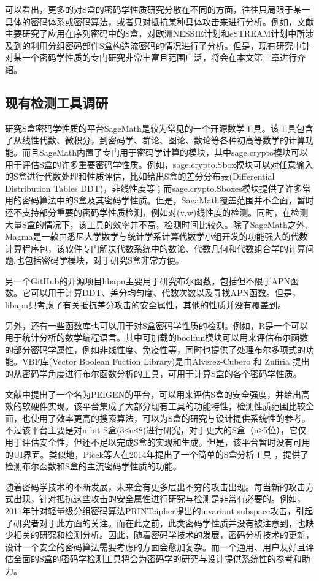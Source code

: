 \documentclass{xduugthesis}
\begin{document}
可以看出，更多的对S盒的密码学性质研究分散在不同的方面，往往只局限于某一具体的密码体系或密码算法，或者只对抵抗某种具体攻击来进行分析。例如，文献\cite{杨斌2013s}主要研究了应用在序列密码中的S盒，对欧洲NESSIE计划和eSTREAM计划中所涉及到的利用分组密码部件S盒构造流密码的情况进行了分析。但是，现有研究中针对某一个密码学性质的专门研究非常丰富且范围广泛，将会在本文第三章进行介绍。\par
\subsection{现有检测工具调研}
研究S盒密码学性质的平台SageMath\cite{SageMath}是较为常见的一个开源数学工具。该工具包含了从线性代数、微积分，到密码学、群论、图论、数论等各种初高等数学的计算功能。而且SageMath内置了专门用于密码学计算的模块，其中sage.crypto模块可以用于评估S盒的许多重要密码学性质。例如，sage.crypto.Sbox模块可以对任意输入的S盒进行代数处理和性质评估，比如给出S盒的差分分布表(Differential Distribution Tables DDT)，非线性度等；而sage.crypto.Sboxes模块提供了许多常用的密码算法中的S盒及其密码学性质。但是，SagaMath覆盖范围并不全面，暂时还不支持部分重要的密码学性质检测，例如对(v,w)线性度的检测。同时，在检测大量S盒的情况下，该工具的效率并不高，检测时间比较久。除了SageMath之外, Magma\cite{Magma}是一款由悉尼大学数学与统计学系计算代数学小组开发的功能强大的代数计算程序包，该软件专门解决代数系统中的数论、代数几何和代数组合学的计算问题,也包括密码学模块，对于研究S盒非常方便。\par
另一个GitHub的开源项目libapn\cite{libapn}主要用于研究布尔函数，包括但不限于APN函数。它可以用于计算DDT、差分均匀度、代数次数以及寻找APN函数。但是，libapn只考虑了有关抵抗差分攻击的安全属性，其他的性质并没有覆盖到。\par
另外，还有一些函数库也可以用于对S盒密码学性质的检测。例如，R是一个可以用于统计分析的数学编程语言。其中可加载的boolfun模块可以用来评估布尔函数的部分密码学属性，例如非线性度、免疫性等，同时也提供了处理布尔多项式的功能。VBF库(Vector Boolean Fuction Library)是由Alverez-Cubero 和 Zufiria 提出的从密码学角度进行布尔函数分析的工具，可用于计算S盒的各个密码学性质\cite{alvarez2016algorithm}。\par
文献\cite{DBLP:journals/tosc/BaoGLS19}中提出了一个名为PEIGEN的平台，可以用来评估S盒的安全强度，并给出高效的软硬件实现。该平台集成了大部分现有工具的功能特性，检测性质范围比较全面，也使用了效率更高的搜索算法，可以为S盒的研究与设计提供系统性的参考。不过该平台主要是对n-bit S盒(3≤n≤8)进行研究，对于更大的S盒（n≥5位），它仅用于评估安全性，但还不足以完成S盒的实现和生成。但是，该平台暂时没有可用的UI界面。类似地，Picek等人在2014年提出了一个简单的S盒分析工具\cite{DBLP:conf/wistp/PicekBJEG14}
，提供了检测布尔函数和S盒的主流密码学性质的功能。\par
随着密码学技术的不断发展，未来会有更多层出不穷的攻击出现。每当新的攻击方式出现，针对抵抗这些攻击的安全属性进行研究与检测是非常有必要的。例如，2011年针对轻量级分组密码算法PRINTcipher提出的invariant subspace攻击\cite{leander2011cryptanalysis}，引起了研究者对于此方面的关注。而在此之前，此类密码学性质并没有被注意到，也缺少相关的研究和检测分析。因此，随着密码学技术的发展，密码分析技术的更新，设计一个安全的密码算法需要考虑的方面会愈加复杂。而一个通用、用户友好且评估全面的S盒的密码学检测工具将会为密码学的研究与设计提供系统性的参考和助力。
\end{document}
